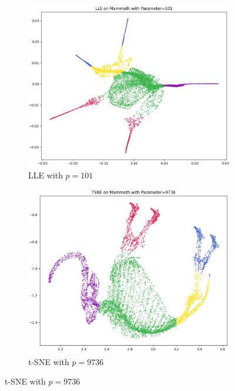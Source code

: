 \begin{figure}[!]
\begin{subfigure}[t]{0.49\columnwidth}
    \end{subfigure}
     \hfill
     \begin{subfigure}[t]{0.49\columnwidth}
    	\centering
    	\includegraphics[width=\columnwidth]{images/mammoth_lle101_plot.png}
    	\caption{LLE with $p=101$}
        \label{fig:mammoth_lle101_plot}
    \end{subfigure}
     \hfill
     \begin{subfigure}[t]{0.49\columnwidth}
    	\centering
    	\includegraphics[width=\columnwidth]{images/mammoth_tsne9736_plot.png}
    	\caption{t-SNE with $p=9736$}
        \label{fig:mammoth_tsne9736_plot}

\end{subfigure}
\end{figure}
